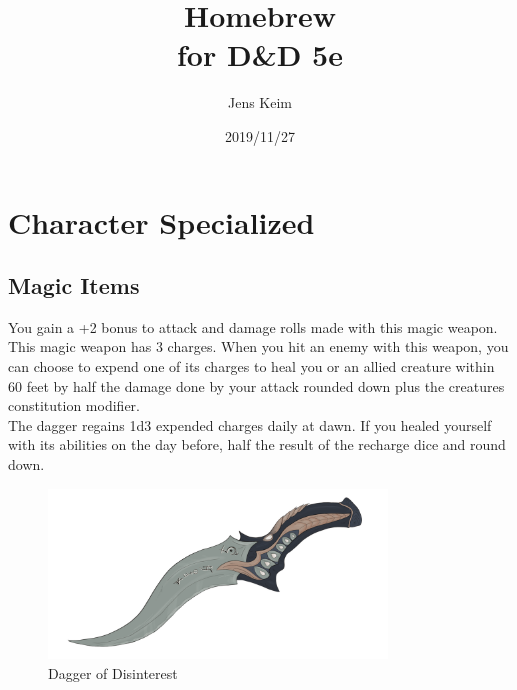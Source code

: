\documentclass[letter,10pt,twocolumn,openany]{dndbook}
\title{Homebrew\\
for D\&D 5e}
\author{Jens Keim}
\date{2019/11/27}
\begin{document}
\frontmatter

\maketitle

\tableofcontents

\mainmatter

\chapter{Character Specialized}

\section{Magic Items}

You gain a +2 bonus to attack and damage rolls made with this magic weapon.\\

This magic weapon has 3 charges. When you hit an enemy with this weapon, you can choose to expend one of its charges to heal you or an allied creature within 60 feet by half the damage done by your attack rounded down plus the creatures constitution modifier.\\
The dagger regains 1d3 expended charges daily at dawn. If you healed yourself with its abilities on the day before, half the result of the recharge dice and round down.\\


\begin{figure}
    \includegraphics[width=9cm]{images/dagger_of_disinterest.png}
    \caption{Dagger of Disinterest}
\end{figure}
\end{document}

